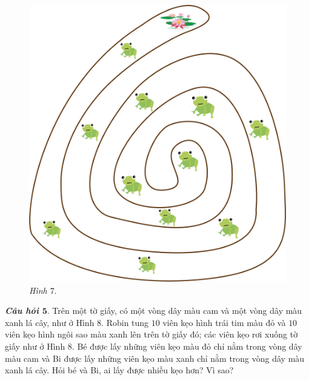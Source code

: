 \begin{multicols}{2}
\begin{figure}[H]
		\includegraphics[width=1\linewidth]{pic11}
		\caption{\small\textit{Hình $7.$}}
		\vspace*{-10pt}
	\end{figure}
	\textbf{\color{toancuabi}\textit{Câu hỏi $\pmb{5.}$}} Trên một tờ giấy, có một vòng dây màu cam và một vòng dây màu xanh lá cây, như ở Hình $8$. Robin tung $10$ viên kẹo hình trái tim màu đỏ và $10$ viên kẹo hình ngôi sao màu xanh lên trên tờ giấy đó; các viên kẹo rơi xuống tờ giấy như ở Hình $8$. Bé được lấy những viên kẹo màu đỏ chỉ nằm trong vòng dây màu cam và Bi được lấy những viên kẹo màu xanh chỉ nằm trong vòng dây màu  xanh lá cây. Hỏi bé và Bi, ai lấy được nhiều kẹo hơn? Vì sao?
	\begin{figure}[H]
		\centering
		\vspace*{-5pt}
		\captionsetup{labelformat= empty, justification=centering}

\end{figure}
\end{multicols}

